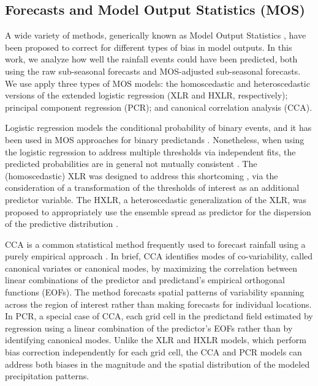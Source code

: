 \documentclass[twocol]{ametsoc}
\begin{document}
\subsection{Forecasts and Model Output Statistics (MOS)}

A wide variety of methods, generically known as Model Output Statistics \citep[MOS;][]{Glahn:1972vt}, have been proposed to correct for different types of bias in model outputs.
In this work, we analyze how well the rainfall events could have been predicted, both using the raw sub-seasonal forecasts and  MOS-adjusted sub-seasonal forecasts.
We use apply three types of MOS models: the homoscedastic and heteroscedastic versions of the extended logistic regression (XLR and HXLR, respectively); principal component regression (PCR); and canonical correlation analysis (CCA).

Logistic regression models the conditional probability of binary events, and it has been used in MOS approaches for binary predictands \citep{Hamill:2004hk}.
Nonetheless, when using the logistic regression to address multiple thresholds via independent fits, the predicted probabilities are in general not mutually consistent \citep{Messner:2014gp}.
The (homoscedastic) XLR was designed to address this shortcoming \citep{Wilks:2009bk}, via the consideration of a transformation of the thresholds of interest as an additional predictor variable.
The HXLR, a heteroscedastic generalization of the XLR, was proposed to appropriately use the ensemble spread as predictor for the dispersion of the predictive distribution \citep{Messner:2014gp}.

CCA is a common statistical method frequently used to forecast rainfall using a purely empirical approach \citep{Mason:2008da,Barnston:2012ce}.
In brief, CCA \citep{Barnston:1992gd,Wilks:2006fx} identifies modes of co-variability, called canonical variates or canonical modes, by maximizing the correlation between linear combinations of the predictor and predictand's empirical orthogonal functions (EOFs).
The method forecasts spatial patterns of variability spanning across the region of interest rather than making forecasts for individual locations.
In PCR, a special case of CCA, each grid cell in the predictand field estimated by regression using a linear combination of the predictor's EOFs \citep{Mason:2008da,Wilks:2006fx} rather than by identifying canonical modes.
Unlike the XLR and HXLR models, which perform bias correction independently for each grid cell, the CCA and PCR models can address both biases in the magnitude and the spatial distribution of the modeled precipitation patterns.
\end{document}
